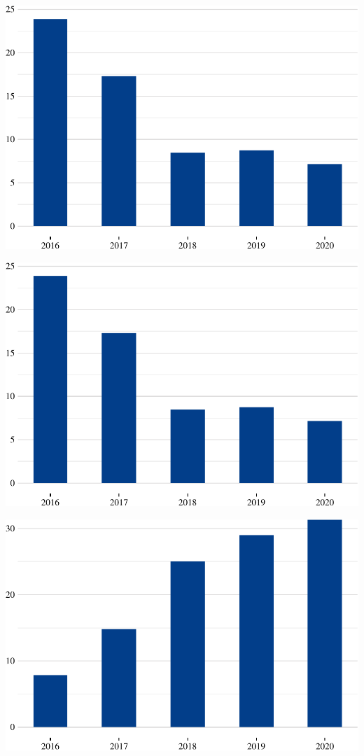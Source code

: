 \includegraphics{fig/transf1-1.pdf}

\includegraphics{fig/ultimo-1.pdf}

\includegraphics{fig/adubos1-1.pdf}

